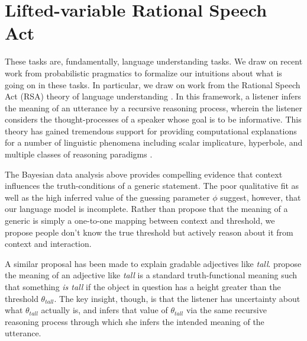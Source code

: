 \documentclass[10pt,letterpaper]{article}
\begin{document}
\section{Lifted-variable Rational Speech Act}


These tasks are, fundamentally, language understanding tasks. We draw on recent work from probabilistic pragmatics to formalize our intuitions about what is going on in these tasks. In particular, we draw on work from the Rational Speech Act (RSA) theory of language understanding \cite{Frank2012,Goodman2013}. In this framework, a listener infers the meaning of an utterance by a recursive reasoning process, wherein the listener considers the thought-processes of a speaker whose goal is to be informative. This theory has gained tremendous support for providing computational explanations for a number of linguistic phenomena including scalar implicature, hyperbole, and multiple classes of reasoning paradigms \cite{Kao2014, Tessler2014, Lassiter2014}. 


The Bayesian data analysis above provides compelling evidence that context influences the truth-conditions of a generic statement. The poor qualitative fit as well as the high inferred value of the guessing parameter $\phi$ suggest, however, that our language model is incomplete. Rather than propose that the meaning of a generic is simply a one-to-one mapping between context and threshold, we propose people don't know the true threshold but actively reason about it from context and interaction. 

A similar proposal has been made to explain gradable adjectives like \emph{tall}.   propose the meaning of an adjective like \emph{tall} is a standard truth-functional meaning such that something \emph{is tall} if the object in question has a height greater than the threshold $\theta_{tall}$. The key insight, though, is that the listener has uncertainty about what $\theta_{tall}$ actually is, and infers that value of $\theta_{tall}$ via the same recursive reasoning process through which she infers the intended meaning of the utterance.
\end{document}
